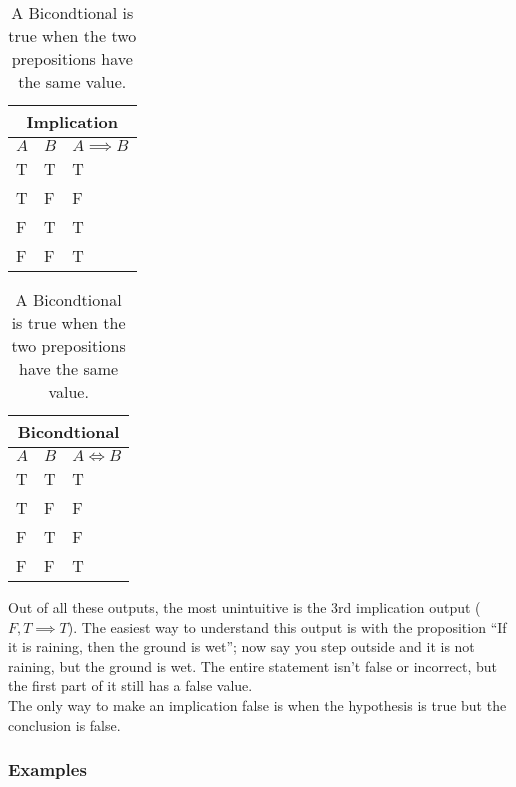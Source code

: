 \documentclass[12pt, letterpaper]{article}
\begin{document}
\begin{table}[h]
    \begin{subtable}[h]{0.45\textwidth}
        \centering
        \begin{tabular}{l | l | l}
		\multicolumn{3}{c}{\textbf{Implication}} \\
        \hline \hline
		$A$ & $B$ & $A \implies B$ \\
		\hline
		T & T & T \\
		T & F & F \\
		F & T & T \\
		F & F & T 
        \end{tabular}
		\caption*{\small{An implication is true when the hypothesis is false or the conclusion is true.}}
     \end{subtable}
    \hfill
    \begin{subtable}[h]{0.45\textwidth}
        \centering
        \begin{tabular}{l | l | l}
		\multicolumn{3}{c}{\textbf{Bicondtional}} \\
        \hline \hline
		$A$ & $B$ & $A \iff B$ \\
		\hline
		T & T & T \\
		T & F & F \\
		F & T & F \\
		F & F & T 
        \end{tabular}
		\caption*{\small{A Bicondtional is true when the two prepositions have the same value.}}
     \end{subtable}
\end{table}

Out of all these outputs, the most unintuitive is the 3rd implication output ($F, T \implies T$). The easiest way to understand this output is with the proposition ``If it is raining, then the ground is wet''; now say you step outside and it is not raining, but the ground is wet. The entire statement isn't false or incorrect, but the first part of it still has a false value. \\ The only way to make an implication false is when the hypothesis is true but the conclusion is false.


\pagebreak
\subsubsection{Examples}
\end{document}
